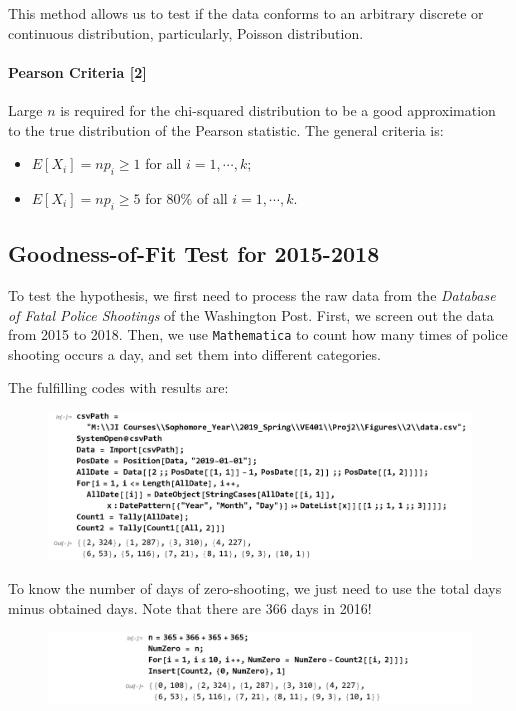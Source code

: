 \documentclass[a4paper]{article}
\begin{document}
This method allows us to test if the data conforms to an arbitrary discrete or continuous distribution, particularly,  Poisson distribution.
\paragraph{Pearson Criteria [2]}
Large $n$ is required for the chi-squared distribution to be a good approximation to the true distribution of the Pearson statistic. The general criteria is:
\begin{itemize}
\item $E[X_i] = np_i \geq 1$ for all $i = 1,\cdots,k$; 
\item $E[X_i] = np_i \geq 5$ for $80\%$ of all $i = 1,\cdots,k$.
\end{itemize}
\subsection{Goodness-of-Fit Test for 2015-2018}
To test the hypothesis, we first need to process the raw data from the \textit{Database of Fatal Police Shootings} of the Washington Post. First, we screen out the data from 2015 to 2018. Then, we use \texttt{Mathematica} to count how many times of police shooting occurs a day, and set them into different categories.

The fulfilling codes with results are:
\begin{figure}[!htbp]
\centering
\includegraphics[width=1\linewidth]{dataprocess.png}
\end{figure}

To know the number of days of zero-shooting, we just need to use the total days minus obtained days. Note that there are 366 days in 2016!
\begin{figure}[!htbp]
\centering
\includegraphics[width=1\linewidth]{dataprocess2.png}
\end{figure}
\end{document}
